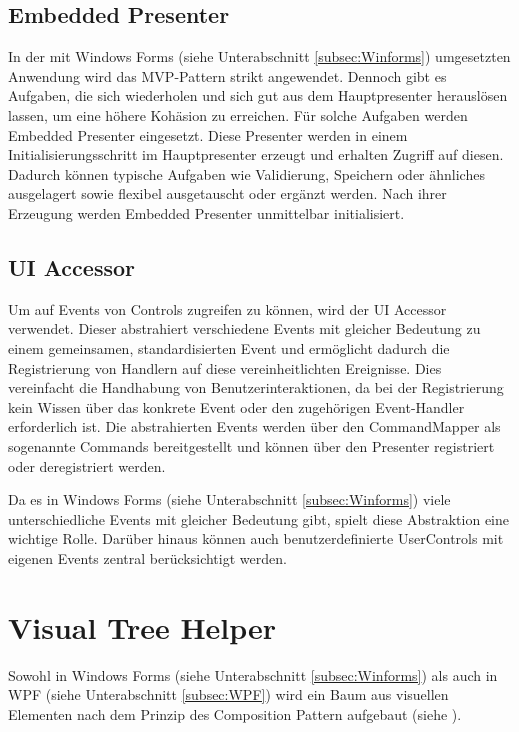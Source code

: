 \subsection{Embedded Presenter}
\label{subsec:embedded_presenter}
In der mit Windows Forms (siehe Unterabschnitt \ref{subsec:Winforms}) umgesetzten Anwendung wird das MVP-Pattern strikt angewendet. Dennoch gibt es Aufgaben, die sich wiederholen und sich gut aus dem Hauptpresenter herauslösen lassen, um eine höhere Kohäsion zu erreichen. Für solche Aufgaben werden Embedded Presenter eingesetzt. Diese Presenter werden in einem Initialisierungsschritt im Hauptpresenter erzeugt und erhalten Zugriff auf diesen. Dadurch können typische Aufgaben wie Validierung, Speichern oder ähnliches ausgelagert sowie flexibel ausgetauscht oder ergänzt werden. Nach ihrer Erzeugung werden Embedded Presenter unmittelbar initialisiert.

\subsection{UI Accessor}

Um auf Events von Controls zugreifen zu können, wird der UI Accessor verwendet. Dieser abstrahiert verschiedene Events mit gleicher Bedeutung zu einem gemeinsamen, standardisierten Event und ermöglicht dadurch die Registrierung von Handlern auf diese vereinheitlichten Ereignisse. Dies vereinfacht die Handhabung von Benutzerinteraktionen, da bei der Registrierung kein Wissen über das konkrete Event oder den zugehörigen Event-Handler erforderlich ist. Die abstrahierten Events werden über den CommandMapper als sogenannte Commands bereitgestellt und können über den Presenter registriert oder deregistriert werden.

Da es in Windows Forms (siehe Unterabschnitt \ref{subsec:Winforms}) viele unterschiedliche Events mit gleicher Bedeutung gibt, spielt diese Abstraktion eine wichtige Rolle. Darüber hinaus können auch benutzerdefinierte UserControls mit eigenen Events zentral berücksichtigt werden.

\section{Visual Tree Helper}
\label{sec:visual_tree_helper}
Sowohl in Windows Forms (siehe Unterabschnitt \ref{subsec:Winforms}) als auch in WPF (siehe Unterabschnitt \ref{subsec:WPF}) wird ein Baum aus visuellen Elementen nach dem Prinzip des Composition Pattern aufgebaut (siehe \cite{gamma1995design}).

